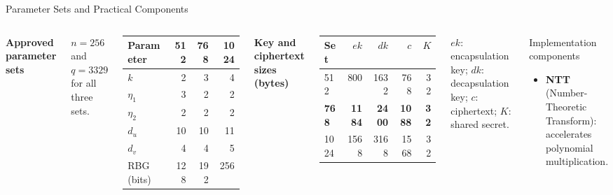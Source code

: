 \documentclass[aspectratio=169,11pt]{beamer}
\begin{document}
\begin{frame}{Parameter Sets and Practical Components}
  \begin{columns}[T,onlytextwidth]
      {\small\textbf{Approved parameter sets}}\par
      {\scriptsize $n=256$ and $q=3329$ for all three sets.}\par\vspace{0.04cm}
      \scriptsize
      \begin{tabular}{lrrr}
        \toprule
        Parameter & 512 & 768 & 1024\\
        \midrule
        $k$ & 2 & 3 & 4\\
        $\eta_1$ & 3 & 2 & 2\\
        $\eta_2$ & 2 & 2 & 2\\
        $d_u$ & 10 & 10 & 11\\
        $d_v$ & 4 & 4 & 5\\
        RBG (bits) & 128 & 192 & 256\\
        \bottomrule
      \end{tabular}\par
      \vspace{0.10cm}
      {\scriptsize\textbf{Key and ciphertext sizes (bytes)}}\par\vspace{0.03cm}
      \scriptsize
      \begin{tabular}{lrrrr}
        \toprule
        Set & $ek$ & $dk$ & $c$ & $K$\\
        \midrule
        512 & 800 & 1632 & 768 & 32\\
        \textbf{768} & \textbf{1184} & \textbf{2400} & \textbf{1088} & \textbf{32}\\
        1024 & 1568 & 3168 & 1568 & 32\\
        \bottomrule
      \end{tabular}\par
      \vspace{0.04cm}
      \par\noindent\parbox[t]{\linewidth}{\tiny $ek$: encapsulation key; $dk$: decapsulation key; $c$: ciphertext; $K$: shared secret.}
      \begin{block}{Implementation components}
        \footnotesize
        \begin{itemize}
          \setlength{\itemsep}{0.13em}
          \item \textbf{NTT} (Number-Theoretic Transform): accelerates polynomial multiplication.

\end{itemize}
\end{block}
\end{columns}
\end{frame}
\end{document}
